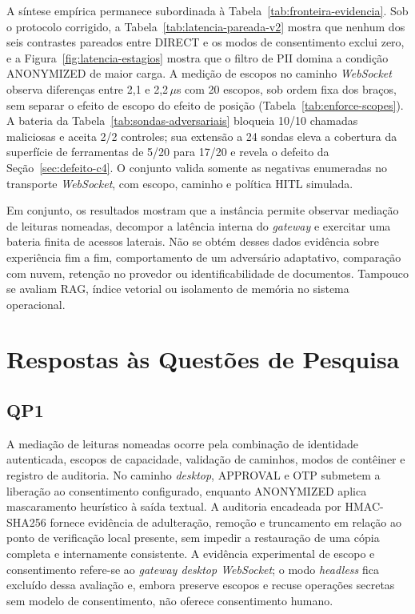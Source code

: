 \documentclass[12pt,openright,twoside,a4paper,english,brazil]{abntex2}
\newcommand{\micro}{\,$\mu$s}
\begin{document}
A síntese empírica permanece subordinada à Tabela~\ref{tab:fronteira-evidencia}. Sob o protocolo corrigido, a Tabela~\ref{tab:latencia-pareada-v2} mostra que nenhum dos seis contrastes pareados entre DIRECT e os modos de consentimento exclui zero, e a Figura~\ref{fig:latencia-estagios} mostra que o filtro de PII domina a condição ANONYMIZED de maior carga. A medição de escopos no caminho \textit{WebSocket} observa diferenças entre 2,1 e 2,2\micro{} com 20 escopos, sob ordem fixa dos braços, sem separar o efeito de escopo do efeito de posição (Tabela~\ref{tab:enforce-scopes}). A bateria da Tabela~\ref{tab:sondas-adversariais} bloqueia 10/10 chamadas maliciosas e aceita 2/2 controles; sua extensão a 24 sondas eleva a cobertura da superfície de ferramentas de 5/20 para 17/20 e revela o defeito da Seção~\ref{sec:defeito-c4}. O conjunto valida somente as negativas enumeradas no transporte \textit{WebSocket}, com escopo, caminho e política HITL simulada.

Em conjunto, os resultados mostram que a instância permite observar mediação de leituras nomeadas, decompor a latência interna do \textit{gateway} e exercitar uma bateria finita de acessos laterais. Não se obtém desses dados evidência sobre experiência fim a fim, comportamento de um adversário adaptativo, comparação com nuvem, retenção no provedor ou identificabilidade de documentos. Tampouco se avaliam RAG, índice vetorial ou isolamento de memória no sistema operacional.

\section{Respostas às Questões de Pesquisa}
\subsection{QP1}
A mediação de leituras nomeadas ocorre pela combinação de identidade autenticada, escopos de capacidade, validação de caminhos, modos de contêiner e registro de auditoria. No caminho \textit{desktop}, APPROVAL e OTP submetem a liberação ao consentimento configurado, enquanto ANONYMIZED aplica mascaramento heurístico à saída textual. A auditoria encadeada por HMAC-SHA256 fornece evidência de adulteração, remoção e truncamento em relação ao ponto de verificação local presente, sem impedir a restauração de uma cópia completa e internamente consistente. A evidência experimental de escopo e consentimento refere-se ao \textit{gateway desktop WebSocket}; o modo \textit{headless} fica excluído dessa avaliação e, embora preserve escopos e recuse operações secretas sem modelo de consentimento, não oferece consentimento humano.
\end{document}
